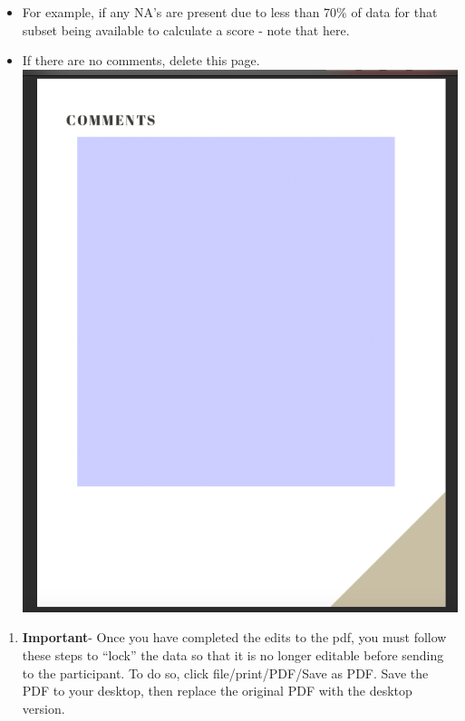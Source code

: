 \documentclass[]{book}
\providecommand{\tightlist}{%
  \setlength{\itemsep}{0pt}\setlength{\parskip}{0pt}}
\begin{document}
\begin{itemize}
\tightlist
\item
  For example, if any NA's are present due to less than 70\% of data for that subset being available to calculate a score - note that here.
\item
  If there are no comments, delete this page.
  \includegraphics{images/report_card_online/5.png}
\end{itemize}

\begin{enumerate}
\def\labelenumi{\arabic{enumi}.}
\setcounter{enumi}{6}
\tightlist
\item
  \textbf{Important}- Once you have completed the edits to the pdf, you must follow these steps to ``lock'' the data so that it is no longer editable before sending to the participant. To do so, click file/print/PDF/Save as PDF. Save the PDF to your desktop, then replace the original PDF with the desktop version.
\end{enumerate}
\end{document}
